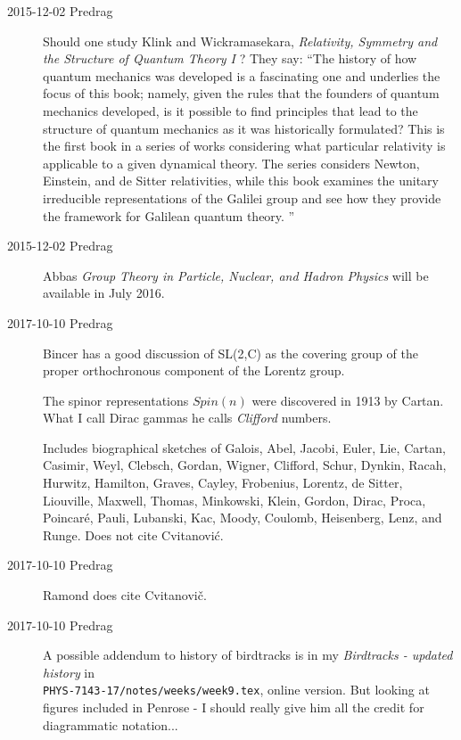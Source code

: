 \begin{description}
\item[2015-12-02  Predrag]
Should one study
Klink and Wickramasekara,
{\em Relativity, Symmetry and the Structure of Quantum Theory I} ?
They say: ``The history of how quantum mechanics was developed is a
fascinating one and underlies the focus of this book; namely, given the
rules that the founders of quantum mechanics developed, is it possible to
find principles that lead to the structure of quantum mechanics as it was
historically formulated? This is the first book in a series of works
considering what particular relativity is applicable to a given dynamical
theory. The series considers Newton, Einstein, and de Sitter
relativities, while this book examines the unitary irreducible
representations of the Galilei group and see how they provide the
framework for Galilean quantum theory.
''

\item[2015-12-02  Predrag] Abbas {\em Group Theory
in Particle, Nuclear, and Hadron Physics} will be available in July 2016.

\item[2017-10-10  Predrag]
Bincer has a good discussion of SL(2,C) as the covering
group of the proper orthochronous component  of the Lorentz group.

The spinor representations $Spin(n)$ were discovered in 1913
by Cartan. What I call Dirac gammas he calls \emph{Clifford} numbers.

Includes biographical sketches of
Galois, Abel, Jacobi, Euler, Lie, Cartan,
Casimir, Weyl, Clebsch, Gordan, Wigner,
Clifford, Schur,
Dynkin, Racah,
Hurwitz, Hamilton, Graves, Cayley, Frobenius,
Lorentz, de Sitter, Liouville, Maxwell, Thomas,
Minkowski, Klein, Gordon, Dirac, Proca,
Poincar\'e, Pauli, Lubanski, Kac, Moody,
Coulomb, Heisenberg, Lenz, and Runge. Does not cite Cvitanovi{\'c}.

\item[2017-10-10  Predrag]
Ramond does cite Cvitanovi\v{c}.

\item[2017-10-10  Predrag]
A possible addendum to history of birdtracks is in my
{\em Birdtracks - updated history} in\\
\texttt{PHYS-7143-17/notes/weeks/week9.tex},
{online version}.
But looking at figures included in Penrose - I should
really give him all the credit for diagrammatic notation...


\end{description}
